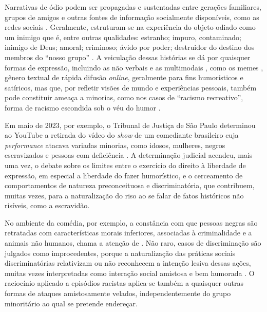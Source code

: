 \documentclass[portuguese]{textolivre}
\begin{document}
Narrativas de ódio podem ser propagadas e sustentadas entre gerações familiares, grupos de amigos e outras fontes de informação socialmente disponíveis, como as redes sociais \cite{kaczmarczyk2019online}. Geralmente, estruturam-se na experiência do objeto odiado como um inimigo que é, entre outras qualidades: estranho; impuro, contaminado; inimigo de Deus; amoral; criminoso; ávido por poder; destruidor do destino dos membros do “nosso grupo” \cite{sternberg2005}. A veiculação dessas histórias se dá por quaisquer formas de expressão, incluindo as não verbais e as multimodais \cite{kress2001multimodal}, como os memes \cite{united20192020}, gênero textual de rápida difusão \textit{online}, geralmente para fins humorísticos e satíricos, mas que, por refletir visões de mundo e experiências pessoais, também pode constituir ameaça a minorias, como nos casos de “racismo recreativo”, forma de racismo escondida sob o véu do humor \cite{moreira2019}.

Em maio de 2023, por exemplo, o Tribunal de Justiça de São Paulo determinou ao YouTube a retirada do vídeo do \emph{show} de um comediante brasileiro cuja \emph{performance} atacava variadas minorias, como idosos, mulheres, negros escravizados e pessoas com deficiência \cite{ramos2023}. A determinação judicial acendeu, mais uma vez, o debate sobre os limites entre o exercício do direito à liberdade de expressão, em especial a liberdade do fazer humorístico, e o cerceamento de comportamentos de natureza preconceituosa e discriminatória, que contribuem, muitas vezes, para a naturalização do riso ao se falar de fatos históricos não risíveis, como a escravidão.

No ambiente da comédia, por exemplo, a constância com que pessoas negras são retratadas com características morais inferiores, associadas à criminalidade e a animais não humanos, chama a atenção de \textcite{moreira2019}. Não raro, casos de discriminação são julgados como improcedentes, porque a naturalização das práticas sociais discriminatórias relativizam ou não reconhecem a intenção lesiva dessas ações, muitas vezes interpretadas como interação social amistosa e bem humorada \cite{moreira2019}. O raciocínio aplicado a episódios racistas aplica-se também a quaisquer outras formas de ataques amistosamente velados, independentemente do grupo minoritário ao qual se pretende endereçar.
\end{document}
